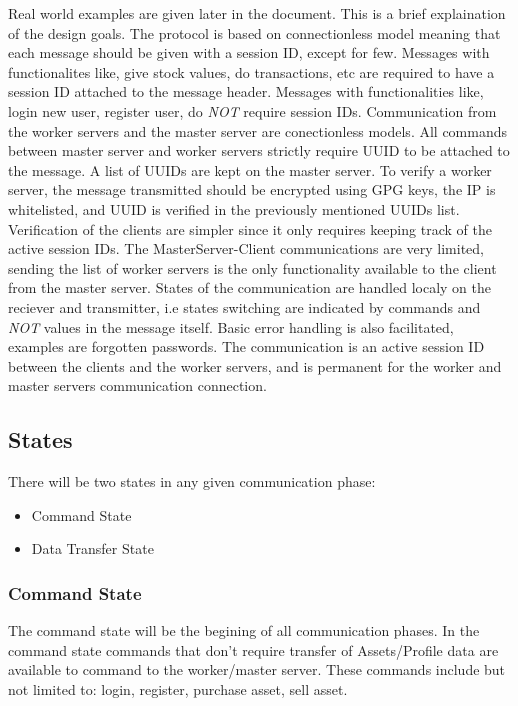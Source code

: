 \documentclass[a4paper]{article}
\begin{document}
Real world examples are given later in the document. This is a brief 
explaination of the design goals. The protocol is based on connectionless model
meaning that each message should be given with a session ID, except for few.
Messages with functionalites like, give stock values, do transactions, etc are
required to have a session ID attached to the message header. Messages with
functionalities like, login new user, register user, do \emph{NOT} require
session IDs. Communication from the worker servers and the master server are
conectionless models. All commands between master server and worker servers
strictly require UUID to be attached to the message. A list of UUIDs are kept 
on the master server. To verify a worker server, the message transmitted should 
be encrypted using GPG keys, the IP is whitelisted, and UUID is verified in the 
previously mentioned UUIDs list. Verification of the clients are simpler since 
it only requires keeping track of the active session IDs. The 
MasterServer-Client communications are very limited, sending the list of
worker servers is the only functionality available to the client from the
master server. States of the communication are handled localy on the reciever 
and transmitter, i.e states switching are indicated by commands and \emph{NOT} 
values in the message itself. Basic error handling is also facilitated, 
examples are forgotten passwords. The communication is an active session ID
between the clients and the worker servers, and is permanent for the worker and
master servers communication connection.

\subsection{States}
\label{states}
There will be two states in any given communication phase:
\begin{itemize}
	\item Command State
	\item Data Transfer State
\end{itemize}

\subsubsection{Command State}
\label{state_command}
The command state will be the begining of all communication phases. In the
command state commands that don't require transfer of Assets/Profile data are
available to command to the worker/master server. These commands include but
not limited to: login, register, purchase asset, sell asset.
\end{document}
